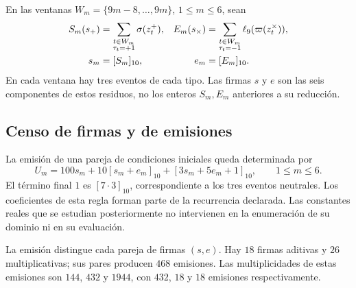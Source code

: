 En las ventanas $W_m=\{9m-8,\ldots,9m\}$, $1\le m\le6$, sean
\begin{align}
 S_m(s_+)&=\sum_{\substack{t\in W_m\\\tau_t=+1}}
                 \sigma(z_t^+),&
 E_m(s_\times)&=\sum_{\substack{t\in W_m\\\tau_t=-1}}
                 \ell_9(\varpi(z_t^\times)),
 \label{iii:iii:nf-firmas}\\
 s_m&=[S_m]_{10},&e_m&=[E_m]_{10}.\notag
\end{align}
En cada ventana hay tres eventos de cada tipo. Las firmas $s$ y $e$
son las seis componentes de estos residuos, no los enteros $S_m,E_m$
anteriores a su reducción.

\subsection{Censo de firmas y de emisiones}

La emisión de una pareja de condiciones iniciales queda determinada por
\begin{equation}
 U_m=100s_m+10[s_m+e_m]_{10}+[3s_m+5e_m+1]_{10},
 \qquad 1\le m\le6.
 \label{iii:iii:nf-emision}
\end{equation}
El término final $1$ es $[7\cdot3]_{10}$, correspondiente a los tres
eventos neutrales. Los coeficientes de esta regla forman parte de la
recurrencia declarada. Las constantes reales que se estudian posteriormente
no intervienen en la enumeración de su dominio ni en su evaluación.

\begin{proposition}
\label{iii:iii:nf-inyectividad}
La emisión distingue cada pareja de firmas $(s,e)$. Hay $18$ firmas
aditivas y $26$ multiplicativas; sus pares producen $468$ emisiones.
Las multiplicidades de estas emisiones son $144$, $432$ y $1944$,
con $432$, $18$ y $18$ emisiones respectivamente.
\end{proposition}

